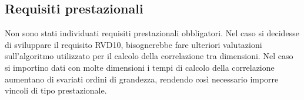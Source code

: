 \subsection{Requisiti prestazionali}
\label{sub:requisiti_prestazionali}
Non sono stati individuati requisiti prestazionali obbligatori. Nel caso si decidesse di sviluppare il requisito RVD10, 
bisognerebbe fare ulteriori valutazioni sull'algoritmo utilizzato per il calcolo della correlazione tra dimensioni. Nel 
caso si importino dati con molte dimensioni i tempi di calcolo della correlazione aumentano di svariati ordini di 
grandezza, rendendo così necessario imporre vincoli di tipo prestazionale.